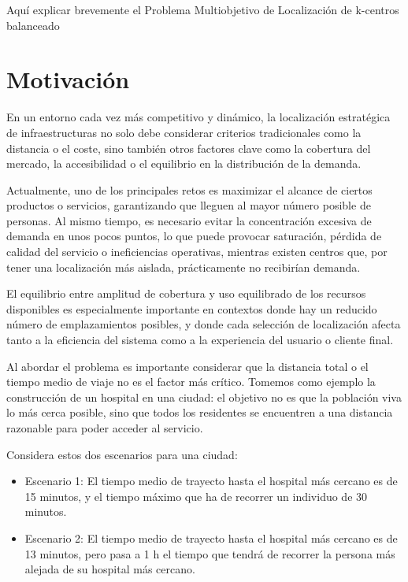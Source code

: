\documentclass[12pt,a4paper]{book}
\begin{document}
\color{red} Aquí explicar brevemente el Problema Multiobjetivo de Localización de k-centros balanceado\color{black}

\section{Motivación}

En un entorno cada vez más competitivo y dinámico, la localización estratégica de infraestructuras no solo debe considerar criterios tradicionales como la distancia o el coste, sino también otros factores clave como la cobertura del mercado, la accesibilidad o el equilibrio en la distribución de la demanda.

Actualmente, uno de los principales retos es maximizar el alcance de ciertos productos o servicios, garantizando que lleguen al mayor número posible de personas. Al mismo tiempo, es necesario evitar la concentración excesiva de demanda en unos pocos puntos, lo que puede provocar saturación, pérdida de calidad del servicio o ineficiencias operativas, mientras existen centros que, por tener una localización más aislada, prácticamente no recibirían demanda.

El equilibrio entre amplitud de cobertura y uso equilibrado de los recursos disponibles es especialmente importante en contextos donde hay un reducido número de emplazamientos posibles, y donde cada selección de localización afecta tanto a la eficiencia del sistema como a la experiencia del usuario o cliente final.

Al abordar el problema es importante considerar que la distancia total o el tiempo medio de viaje no es el factor más crítico. 
Tomemos como ejemplo la construcción de un hospital en una ciudad: el objetivo no es que la población viva lo más cerca posible, sino que todos los residentes se encuentren a una distancia razonable para poder acceder al servicio.

Considera estos dos escenarios para una ciudad:

\begin{itemize}
    \item Escenario 1: El tiempo medio de trayecto hasta el hospital más cercano es de 15 minutos, y el tiempo máximo que ha de recorrer un individuo de 30 minutos.
    \item Escenario 2: El tiempo medio de trayecto hasta el hospital más cercano es de 13 minutos, pero pasa a 1 h el tiempo que tendrá de recorrer la persona más alejada de su hospital más cercano.
\end{itemize} 
\end{document}

